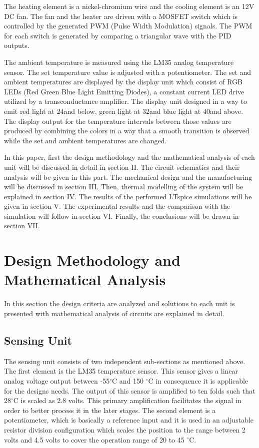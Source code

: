 \documentclass[conference]{IEEEtran}
\begin{document}
The heating element is a nickel-chromium wire and the cooling element is an 12V DC fan. The fan and the heater are driven with a MOSFET switch which is controlled by the generated PWM (Pulse Width Modulation) signals. The PWM for each switch is generated by comparing a triangular wave with the PID outputs.

The ambient temperature is measured using the LM35 analog temperature sensor. The set temperature value is adjusted with a potentiometer. The set and ambient temperatures are displayed by the display unit which consist of RGB LEDs (Red Green Blue Light Emitting Diodes), a constant current LED drive utilized by a transconductance amplifier. The display unit designed in a way to emit red light at 24\celsius and below, green light at 32\celsius and blue light at 40\celsius and above. The display output for the temperature intervals between those values are produced by combining the colors in a way that a smooth transition is observed while the set and ambient temperatures are changed.

In this paper, first the design methodology and the mathematical analysis of each unit will be discussed in detail in section II. The circuit schematics and their analysis will be given in this part. The mechanical design and the manufacturing will be discussed in section III. Then, thermal modelling of the system will be explained in section IV. The results of the performed LTspice simulations will be given in section V. The experimental results and the comparison with the simulation will follow in section VI. Finally, the conclusions will be drawn in section VII.


\section{Design Methodology and Mathematical Analysis}

In this section the design criteria are analyzed and solutions to each unit is presented with mathematical analysis of circuits are explained in detail.
 
\subsection{Sensing Unit}

The sensing unit consists of two independent sub-sections as mentioned above. The first element is the LM35 temperature sensor. This sensor gives a linear analog voltage output between -55$ ^\circ$C and 150  $ ^\circ$C in consequence it is applicable for the designs needs. The output of this sensor is amplified to ten folds such that 28$^\circ$C is scaled as 2.8 volts. This primary amplification facilitates the signal in order to better process it in the later stages. The second element is a potentiometer, which is basically a reference input and it is used in an adjustable resistor division configuration which scales the position to the range between 2 volts and 4.5 volts to cover the operation range of 20 to 45 $^\circ$C.
\end{document}
